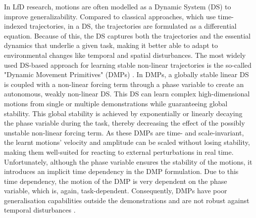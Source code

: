 In LfD research, motions are often modelled as a Dynamic System (DS) \cite{khansari-zadehLearningStableNonlinear2011} to improve generalizability. Compared to classical approaches, which use time-indexed trajectories, in a DS, the trajectories are formulated as a differential equation. Because of this, the DS captures both the trajectories and the essential dynamics that underlie a given task, making it better able to adapt to environmental changes like temporal and spatial disturbances. The most widely used DS-based approach for learning stable non-linear trajectories is the so-called "Dynamic Movement Primitives" (DMPs) \cite{ijspeertDynamicalMovementPrimitives2013,saverianoDynamicMovementPrimitives2021,wangLearningDemonstrationUsing2021,sidiropoulosReversibleDynamicMovement2021,ginesiOvercomingDrawbacksDynamic2021,rozanecNeuralDynamicMovement2022,liProDMPsUnifiedPerspective2022}. In DMPs, a globally stable linear DS is coupled with a non-linear forcing term through a phase variable to create an autonomous, weakly non-linear DS. This DS can learn complex high-dimensional motions from single \cite{ijspeertDynamicalMovementPrimitives2013,prakashDynamicTrajectoryGeneration2020} or multiple demonstrations \cite{matsubaraLearningParametricDynamic2011,pervezLearningTaskparameterizedDynamic2018} while guaranteeing global stability. This global stability is achieved by exponentially or linearly decaying the phase variable during the task, thereby decreasing the effect of the possibly unstable non-linear forcing term. As these DMPs are time- and scale-invariant, the learnt motions' velocity and amplitude can be scaled without losing stability, making them well-suited for reacting to external perturbations in real time. Unfortunately, although the phase variable ensures the stability of the motions, it introduces an implicit time dependency in the DMP formulation. Due to this time dependency, the motion of the DMP is very dependent on the phase variable, which is, again, task-dependent. Consequently, DMPs have poor generalisation capabilities outside the demonstrations and are not robust against temporal disturbances \cite{neumannLearningRobotMotions2015}.

